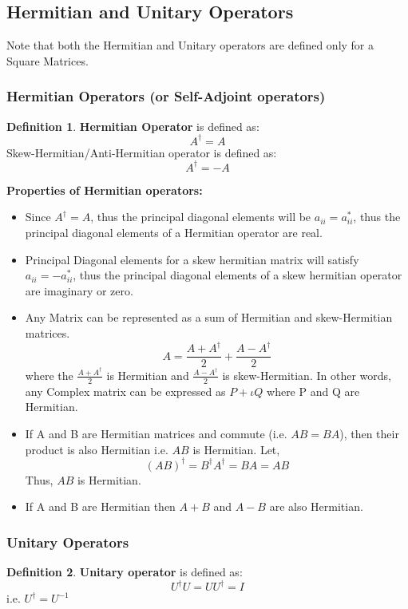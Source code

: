\documentclass[12pt, oneside]{book}
\theoremstyle{definition}
\newtheorem{definition}{Definition}[section]
\theoremstyle{definition}
\theoremstyle{remark}
\begin{document}
\subsection{Hermitian and Unitary Operators}
Note that both the Hermitian and Unitary operators are defined only for a Square Matrices.

\subsubsection{Hermitian Operators (or Self-Adjoint operators)}
\begin{definition}
\textbf{Hermitian Operator} is defined as:
\[A^{\dagger}=A\]
Skew-Hermitian/Anti-Hermitian operator is defined as:
\[A^{\dagger}=-A\]
\end{definition}

\textbf{Properties of Hermitian operators: }
\begin{itemize}
    \item Since $A^{\dagger}=A$, thus the principal diagonal elements will be $a_{ii}=a_{ii}^*$, thus the principal diagonal elements of a Hermitian operator are real.
    \item Principal Diagonal elements for a skew hermitian matrix will satisfy $a_{ii}=-a_{ii}^*$, thus the principal diagonal elements of a skew hermitian operator are imaginary or zero.
    \item Any Matrix can be represented as a sum of Hermitian and skew-Hermitian matrices.
    \[ A = \frac{A+A^{\dagger}}{2} + \frac{A-A^{\dagger}}{2} \] 
    where the $\frac{A + A^{\dagger}}{2}$ is Hermitian and $\frac{A-A^{\dagger}}{2}$ is skew-Hermitian. In other words, any Complex matrix can be expressed as $P+ \iota Q$ where P and Q are Hermitian.
    \item If A and B are Hermitian matrices and commute (i.e. $AB=BA$), then their product is also Hermitian i.e. $AB$ is Hermitian.
    Let,
    \[ (AB)^{\dagger}=B^{\dagger}A^{\dagger}=BA=AB \]
    Thus, $AB$ is Hermitian.
    \item If A and B are Hermitian then $A+B$ and $A-B$ are also Hermitian.
\end{itemize}

\subsubsection{Unitary Operators}\label{subsubsec:Unitary Operators}
\begin{definition}
\textbf{Unitary operator} is defined as:
\[U^{\dagger}U=UU^{\dagger}=I\]
i.e. $U^{\dagger}=U^{-1}$\\
\end{definition}
\end{document}

